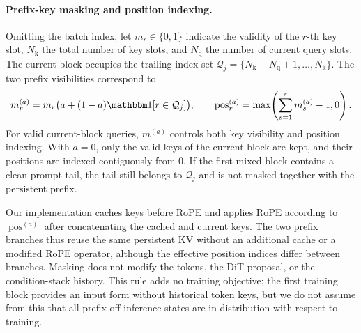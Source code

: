 \paragraph{Prefix-key masking and position indexing.}
Omitting the batch index, let $m_r\in\{0,1\}$ indicate the validity of the $r$-th key slot, $N_{\mathrm k}$ the total number of key slots, and $N_{\mathrm q}$ the number of current query slots. The current block occupies the trailing index set $\mathcal Q_j=\{N_{\mathrm k}-N_{\mathrm q}+1,\ldots,N_{\mathrm k}\}$. The two prefix visibilities correspond to
\begin{equation}
    m_r^{(a)}=m_r\big(a+(1-a)\ind[r\in\mathcal Q_j]\big),
    \qquad
    \operatorname{pos}^{(a)}_r
    =\max\!\left(\sum_{s=1}^{r}m_s^{(a)}-1,0\right).
    \label{eq:app-prefix-cfg-key-mask}
\end{equation}
For valid current-block queries, $m^{(a)}$ controls both key visibility and position indexing. With $a=0$, only the valid keys of the current block are kept, and their positions are indexed contiguously from $0$. If the first mixed block contains a clean prompt tail, the tail still belongs to $\mathcal Q_j$ and is not masked together with the persistent prefix.

Our implementation caches keys before RoPE and applies RoPE according to $\operatorname{pos}^{(a)}$ after concatenating the cached and current keys. The two prefix branches thus reuse the same persistent KV without an additional cache or a modified RoPE operator, although the effective position indices differ between branches. Masking does not modify the tokens, the DiT proposal, or the condition-stack history. This rule adds no training objective; the first training block provides an input form without historical token keys, but we do not assume from this that all prefix-off inference states are in-distribution with respect to training.

